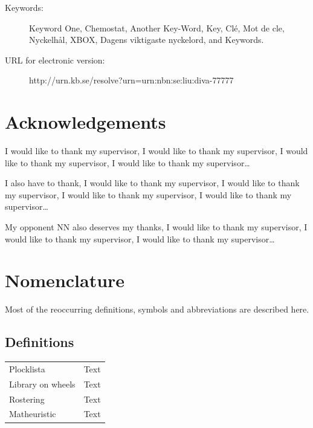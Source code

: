 \documentclass[a4paper, 10pt, twoside, openright]{book}
\newcommand{\putkeywords}[0]{%
Keyword One, Chemostat, Another Key-Word, Key, Clé, Mot de cle,
Nyckelhål, XBOX, Dagens viktigaste nyckelord, and Keywords.}
\begin{document}
\begin{description}
\item[Keywords:]{%
\putkeywords
}
\item[URL for electronic version: ]{\hfill%
\begin{center}
http://urn.kb.se/resolve?urn=urn:nbn:se:liu:diva-77777
\end{center}
}
\end{description}



\chapter*{Acknowledgements}

I would like to thank my supervisor, I would like to thank my
supervisor, I would like to thank my supervisor, I would like to thank my supervisor\ldots

I also have to thank, I would like to thank my supervisor, I would
like to thank my supervisor, I would like to thank my supervisor, I
would like to thank my supervisor\ldots

My opponent NN also deserves my thanks, I would like to thank my
supervisor, I would like to thank my supervisor, I would like to thank my supervisor\ldots





\chapter*{Nomenclature}

Most of the reoccurring definitions, symbols and abbreviations are described here.

\section*{Definitions}
\begin{tabular}{ll}
Plocklista & Text\\
Library on wheels & Text\\
Rostering & Text\\
Matheuristic & Text\\
\end{tabular}
\end{document}
